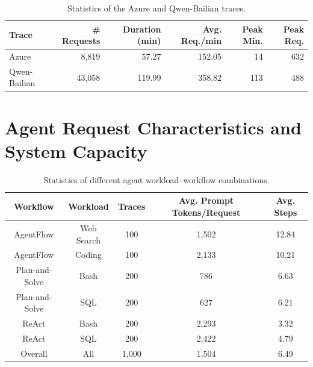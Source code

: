 \begin{table}[H]
    \centering
    \caption{Statistics of the Azure and Qwen-Bailian traces.}
    \label{tab:trace_statistics}
    \begin{tabular}{lrrrrr}
        \toprule
        \textbf{Trace} &
        \textbf{\# Requests} &
        \textbf{Duration (min)} &
        \textbf{Avg. Req./min} &
        \textbf{Peak Min.} &
        \textbf{Peak Req.} \\
        \midrule
        Azure         & 8,819  & 57.27  & 152.05 & 14  & 632 \\
        Qwen-Bailian  & 43,058 & 119.99 & 358.82 & 113 & 488 \\
        \bottomrule
    \end{tabular}
\end{table}


\clearpage

\section{Agent Request Characteristics and System Capacity}
\label{request-and-resource-analysis}

\begin{table}[H]
    \centering
    \caption{Statistics of different agent workload–workflow combinations.}
    \label{tab:agent-workload-statistics}
    \begin{tabular}{ccccc}
        \toprule
        \textbf{Workflow} & \textbf{Workload} & \textbf{Traces} &
        \textbf{Avg. Prompt Tokens/Request} & \textbf{Avg. Steps} \\
        \midrule
        AgentFlow  & Web Search   & 100   & 1,502 & 12.84 \\
        AgentFlow  & Coding    & 100   & 2,133 & 10.21 \\
        Plan-and-Solve & Bash & 200   & 786   & 6.63 \\
        Plan-and-Solve & SQL  & 200   & 627   & 6.21 \\
        ReAct      & Bash & 200   & 2,293 & 3.32 \\
        ReAct      & SQL  & 200   & 2,422 & 4.79 \\
        \midrule
        Overall    & All     & 1,000 & 1,504 & 6.49 \\
        \bottomrule
    \end{tabular}
\end{table}

